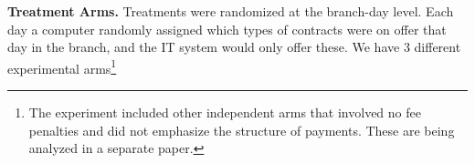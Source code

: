 \documentclass[ecta,nameyear,final]{econsocart}
\begin{document}

\noindent \textbf{Treatment Arms.} Treatments were randomized at the branch-day level. Each day a computer randomly assigned which types of contracts were on offer that day in the branch, and the IT system would only offer these.  We have 3 different experimental arms\footnote{The experiment included other independent arms that involved no fee penalties and did not emphasize the structure of payments. These are being analyzed in a separate paper.} 
\end{document}
